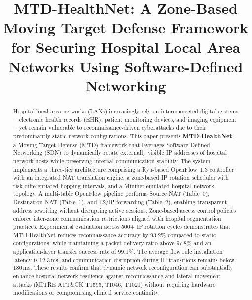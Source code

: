 \documentclass[conference]{IEEEtran}
\begin{document}
\title{MTD-HealthNet: A Zone-Based Moving Target Defense Framework for Securing Hospital Local Area Networks Using Software-Defined Networking}

\author{
}

\maketitle

\begin{abstract}
Hospital local area networks (LANs) increasingly rely on interconnected digital systems---electronic health records (EHR), patient monitoring devices, and imaging equipment---yet remain vulnerable to reconnaissance-driven cyberattacks due to their predominantly static network configurations. This paper presents \textbf{MTD-HealthNet}, a Moving Target Defense (MTD) framework that leverages Software-Defined Networking (SDN) to dynamically rotate externally visible IP addresses of hospital network hosts while preserving internal communication stability. The system implements a three-tier architecture comprising a Ryu-based OpenFlow~1.3 controller with an integrated NAT translation engine, a zone-based IP rotation scheduler with risk-differentiated hopping intervals, and a Mininet-emulated hospital network topology. A multi-table OpenFlow pipeline performs Source NAT (Table~0), Destination NAT (Table~1), and L2/IP forwarding (Table~2), enabling transparent address rewriting without disrupting active sessions. Zone-based access control policies enforce inter-zone communication restrictions aligned with hospital segmentation practices. Experimental evaluation across 500+ IP rotation cycles demonstrates that MTD-HealthNet reduces reconnaissance accuracy by 93.2\% compared to static configurations, while maintaining a packet delivery ratio above 97.8\% and an application-layer transfer success rate of 99.1\%. The average flow rule installation latency is 12.3\,ms, and communication disruption during IP transitions remains below 180\,ms. These results confirm that dynamic network reconfiguration can substantially enhance hospital network resilience against reconnaissance and lateral movement attacks (MITRE ATT\&CK T1595, T1046, T1021) without requiring hardware modifications or compromising clinical service continuity.
\end{abstract}
\end{document}
